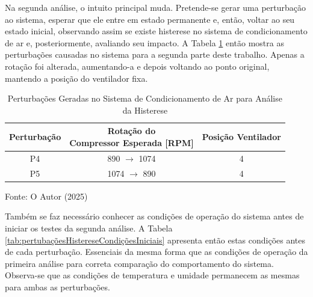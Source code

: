 \newpage
Na segunda análise, o intuito principal muda. Pretende-se gerar uma perturbação ao sistema, esperar que ele entre em estado permanente e, então, voltar ao seu estado inicial, observando assim se existe histerese no sistema de condicionamento de ar e, posteriormente, avaliando seu impacto. A Tabela \ref{tab:pertubaçõesHisterese} então mostra as perturbações causadas no sistema para a segunda parte deste trabalho. Apenas a rotação foi alterada, aumentando-a e depois voltando ao ponto original, mantendo a posição do ventilador fixa.
\\
\begin{table}[h]
    \centering
    \begin{tabular}{|c|c|c|}
        \hline
        \textbf{Perturbação} & \makecell{\textbf{Rotação do} \\ \textbf{Compressor Esperada [RPM]}} & \textbf{Posição Ventilador} \\
        \hline
        P4 & 890 $\rightarrow$ 1074 & 4  \\
        P5 & 1074 $\rightarrow$ 890 & 4  \\
        \hline
    \end{tabular}
    \caption{Perturbações Geradas no Sistema de Condicionamento de Ar para Análise da Histerese}
    
    \vspace{5pt} 
    {\footnotesize Fonte: O Autor (2025)}
    \label{tab:pertubaçõesHisterese}
\end{table}

Também se faz necessário conhecer as condições de operação do sistema antes de iniciar os testes da segunda análise. A Tabela \ref{tab:pertubaçõesHistereseCondiçõesIniciais} apresenta então estas condições  antes de cada perturbação. Essenciais da mesma forma que as condições de operação da primeira análise para correta comparação do comportamento do sistema. Observa-se que as condições de temperatura e umidade permanecem as mesmas para ambas as perturbações.

